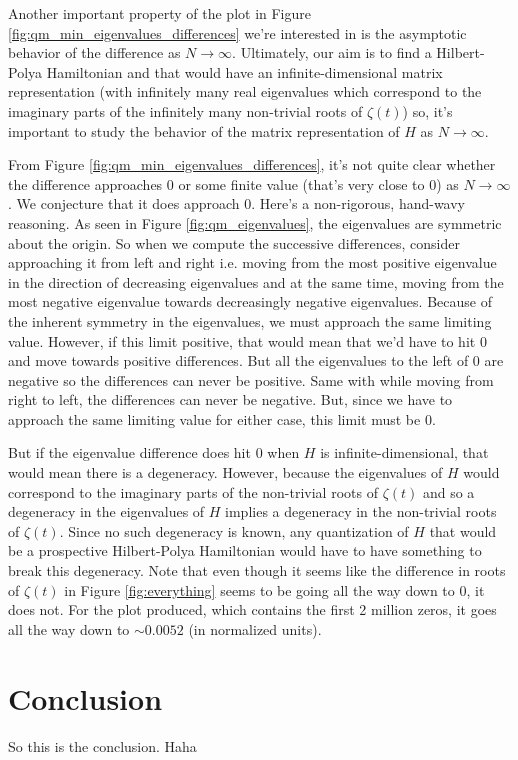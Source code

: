 \documentclass{amsproc}
\theoremstyle{definition}
\theoremstyle{remark}
\numberwithin{equation}{section}
\begin{document}
Another important property of the plot in Figure \ref{fig:qm_min_eigenvalues_differences} we're interested in is the asymptotic behavior of the difference as $N \to \infty$. Ultimately, our aim is to find a Hilbert-Polya Hamiltonian and that would have an infinite-dimensional matrix representation (with infinitely many real eigenvalues which correspond to the imaginary parts of the infinitely many non-trivial roots of $\zeta(t)$) so, it's important to study the behavior of the matrix representation of $H$ as $N \to \infty$.

From Figure \ref{fig:qm_min_eigenvalues_differences}, it's not quite clear whether the difference approaches 0 or some finite value (that's very close to $0$) as $N \to \infty$. We conjecture that it does approach $0$. Here's a non-rigorous, hand-wavy reasoning. As seen in Figure \ref{fig:qm_eigenvalues}, the eigenvalues are symmetric about the origin. So when we compute the successive differences, consider approaching it from left and right i.e. moving from the most positive eigenvalue in the direction of decreasing eigenvalues and at the same time, moving from the most negative eigenvalue towards decreasingly negative eigenvalues. Because of the inherent symmetry in the eigenvalues, we must approach the same limiting value. However, if this limit positive, that would mean that we'd have to hit $0$ and move towards positive differences. But all the eigenvalues to the left of $0$ are negative so the differences can never be positive. Same with while moving from right to left, the differences can never be negative. But, since we have to approach the same limiting value for either case, this limit must be $0$.

But if the eigenvalue difference does hit $0$ when $H$ is infinite-dimensional, that would mean there is a degeneracy. However, because the eigenvalues of $H$ would correspond to the imaginary parts of the non-trivial roots of $\zeta(t)$ and so a degeneracy in the eigenvalues of $H$ implies a degeneracy in the non-trivial roots of $\zeta(t)$. Since no such degeneracy is known, any quantization of $H$ that would be a prospective Hilbert-Polya Hamiltonian would have to have something to break this degeneracy. Note that even though it seems like the difference in roots of $\zeta(t)$ in Figure \ref{fig:everything} seems to be going all the way down to 0, it does not. For the plot produced, which contains the first 2 million zeros, it goes all the way down to $\sim 0.0052$ (in normalized units). 

\section{Conclusion}
So this is the conclusion. Haha
\end{document}
